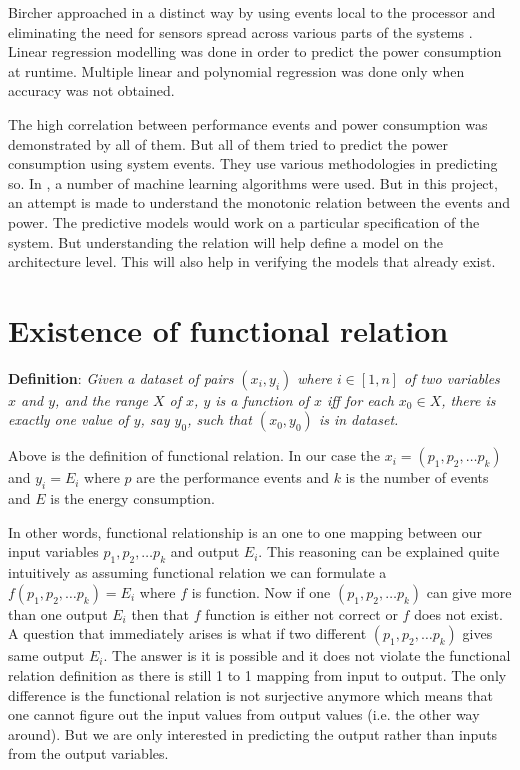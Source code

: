 Bircher approached in a distinct way by using events local to the processor and eliminating the need for sensors spread across various parts of the systems \cite{bircher2012complete}. Linear regression modelling was done in order to predict the power consumption at runtime. Multiple linear and polynomial regression was done only when accuracy was not obtained. 

The high correlation between performance events and power consumption was demonstrated by all of them. But all of them tried to predict the power consumption using system events. They use various methodologies in predicting so. In \cite{yang2016performance}, a number of machine learning algorithms were used. But in this project, an attempt is made to understand the monotonic relation between the events and power. The predictive models would work on a particular specification of the system. But understanding the relation will help define a model on the architecture level. This will also help in verifying the models that already exist.


\section{Existence of functional relation}

\textbf{Definition}: \textit{Given a dataset of pairs \((x_i, y_i)\) where \(i \in [1, n]\) of two variables \(x\) and \(y\), and the range \(X\) of \(x\), \(y\) is a function of \(x\) iff for each \(x_0 \in X\), there is exactly one value of \(y\), say \(y_0\), such that \((x_0, y_0)\) is in dataset.}~\cite{zembowicz1993testing}

Above is the definition of functional relation. In our case the \(x_i = (p_1, p_2, \ldots p_k)\) and \(y_i = E_i\) where \(p\) are the performance events and \(k\) is the number of events and \(E\) is the energy consumption.

In other words, functional relationship is an one to one mapping between our input variables \(p_1, p_2, \ldots p_k\) and output \(E_i\). This reasoning can be explained quite intuitively as assuming functional relation we can formulate a \(f(p_1, p_2, \ldots p_k) = E_i\) where \(f\) is function. Now if one \((p_1, p_2, \ldots p_k)\) can give more than one output \(E_i\) then that \(f\) function is either not correct or \(f\) does not exist. A question that immediately arises is what if two different \((p_1, p_2, \ldots p_k)\) gives same output \(E_i\). The answer is it is possible and it does not violate the functional relation definition as there is still 1 to 1 mapping from input to output. The only difference is the functional relation is not surjective anymore which means that one cannot figure out the input values from output values (i.e. the other way around). But we are only interested in predicting the output rather than inputs from the output variables.

